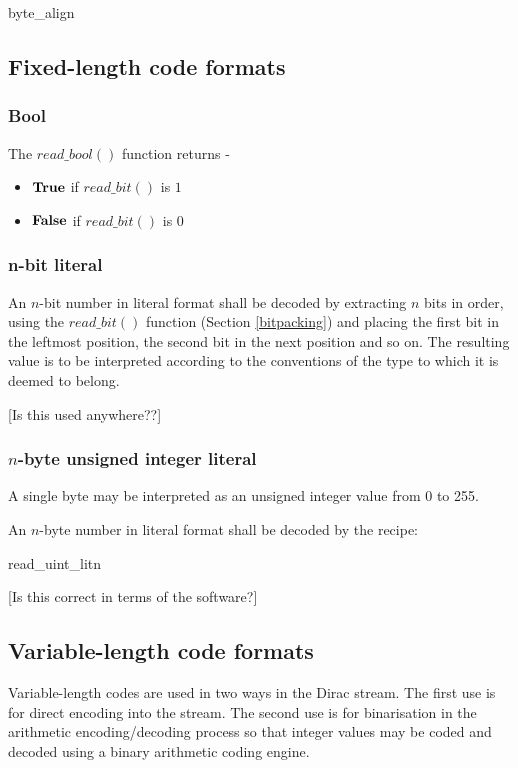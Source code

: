\begin{pseudo}{byte\_align}{}
\bsEND
\end{pseudo}

\subsection{Fixed-length code formats}
\subsubsection{Bool}

The $read\_bool()$ function returns -
\begin{itemize}
\item $\text{\bf{True}}$ if $read\_bit()$ is $1$
\item $\text{\bf{False}}$ if $read\_bit()$ is $0$
\end{itemize}

\subsubsection{n-bit literal}
An $n$-bit number in literal format shall be decoded by extracting $n$ bits
in order, using the $read\_bit()$ function (Section \ref{bitpacking})
 and placing the first bit in the leftmost position, the second
bit in the next position and so on. The resulting value is to be
interpreted according to the conventions of the type to which it is
deemed to belong.

[Is this used anywhere??] 

\subsubsection{$n$-byte unsigned integer literal}
A single byte may be interpreted as an unsigned integer value from 0 to 255.

An $n$-byte number in literal format shall be decoded by the recipe:

\begin{pseudo}{read\_uint\_lit}{n}
\bsEND
{}
\end{pseudo}

[Is this correct in terms of the software?]

\subsection{Variable-length code formats}
\label{vlc}
Variable-length codes are used in two ways in the Dirac stream. The first
use is for direct encoding into the stream. The second use is for binarisation
in the arithmetic encoding/decoding process so that integer values may be 
coded and decoded using a binary arithmetic coding engine. 

